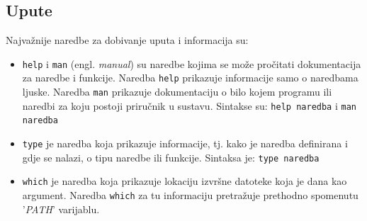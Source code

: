 \documentclass{foi}
\begin{document}
\subsection{Upute}
Najvažnije naredbe za dobivanje uputa i informacija su:
\begin{itemize}
    \item \verb|help| i \verb|man| (engl. \textit{manual}) su naredbe kojima se može pročitati dokumentacija za naredbe i funkcije. Naredba \verb|help| prikazuje informacije samo o naredbama ljuske. Naredba \verb|man| prikazuje dokumentaciju o bilo kojem programu ili naredbi za koju postoji priručnik u sustavu. Sintakse su: \verb|help naredba| i \verb|man naredba|
    \item \verb|type| je naredba koja prikazuje informacije, tj. kako je naredba definirana i gdje se nalazi, o tipu naredbe ili funkcije. Sintaksa je: \verb|type naredba|
    \item \verb|which| je naredba koja prikazuje lokaciju izvršne datoteke koja je dana kao argument. Naredba \verb|which| za tu informaciju pretražuje prethodno spomenutu '\textit{PATH}' varijablu.
\end{itemize}
\end{document}
